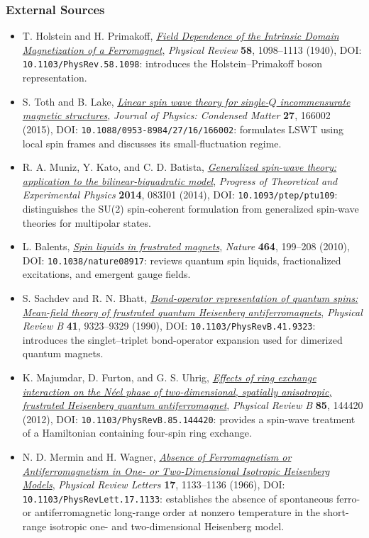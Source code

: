 \subsubsection{External Sources}

\begin{itemize}
\tightlist
\item
  T. Holstein and H. Primakoff, \href{https://doi.org/10.1103/PhysRev.58.1098}{\emph{Field Dependence of the Intrinsic Domain Magnetization of a Ferromagnet}}, \emph{Physical Review} \textbf{58}, 1098--1113 (1940), DOI: \texttt{10.1103/PhysRev.58.1098}: introduces the Holstein--Primakoff boson representation.
\item
  S. Toth and B. Lake, \href{https://doi.org/10.1088/0953-8984/27/16/166002}{\emph{Linear spin wave theory for single-\(Q\) incommensurate magnetic structures}}, \emph{Journal of Physics: Condensed Matter} \textbf{27}, 166002 (2015), DOI: \texttt{10.1088/0953-8984/27/16/166002}: formulates LSWT using local spin frames and discusses its small-fluctuation regime.
\item
  R. A. Muniz, Y. Kato, and C. D. Batista, \href{https://doi.org/10.1093/ptep/ptu109}{\emph{Generalized spin-wave theory: application to the bilinear-biquadratic model}}, \emph{Progress of Theoretical and Experimental Physics} \textbf{2014}, 083I01 (2014), DOI: \texttt{10.1093/ptep/ptu109}: distinguishes the SU(2) spin-coherent formulation from generalized spin-wave theories for multipolar states.
\item
  L. Balents, \href{https://doi.org/10.1038/nature08917}{\emph{Spin liquids in frustrated magnets}}, \emph{Nature} \textbf{464}, 199--208 (2010), DOI: \texttt{10.1038/nature08917}: reviews quantum spin liquids, fractionalized excitations, and emergent gauge fields.
\item
  S. Sachdev and R. N. Bhatt, \href{https://doi.org/10.1103/PhysRevB.41.9323}{\emph{Bond-operator representation of quantum spins: Mean-field theory of frustrated quantum Heisenberg antiferromagnets}}, \emph{Physical Review B} \textbf{41}, 9323--9329 (1990), DOI: \texttt{10.1103/PhysRevB.41.9323}: introduces the singlet--triplet bond-operator expansion used for dimerized quantum magnets.
\item
  K. Majumdar, D. Furton, and G. S. Uhrig, \href{https://doi.org/10.1103/PhysRevB.85.144420}{\emph{Effects of ring exchange interaction on the Néel phase of two-dimensional, spatially anisotropic, frustrated Heisenberg quantum antiferromagnet}}, \emph{Physical Review B} \textbf{85}, 144420 (2012), DOI: \texttt{10.1103/PhysRevB.85.144420}: provides a spin-wave treatment of a Hamiltonian containing four-spin ring exchange.
\item
  N. D. Mermin and H. Wagner, \href{https://doi.org/10.1103/PhysRevLett.17.1133}{\emph{Absence of Ferromagnetism or Antiferromagnetism in One- or Two-Dimensional Isotropic Heisenberg Models}}, \emph{Physical Review Letters} \textbf{17}, 1133--1136 (1966), DOI: \texttt{10.1103/PhysRevLett.17.1133}: establishes the absence of spontaneous ferro- or antiferromagnetic long-range order at nonzero temperature in the short-range isotropic one- and two-dimensional Heisenberg model.
\end{itemize}
